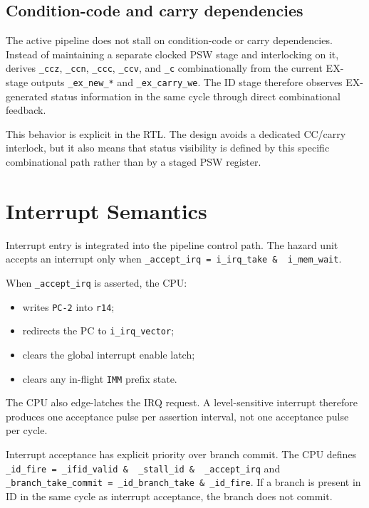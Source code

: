 \documentclass[11pt,a4paper]{article}
\begin{document}
\subsection{Condition-code and carry dependencies}

The active pipeline does not stall on condition-code or carry dependencies. Instead of maintaining a separate clocked PSW stage and interlocking on it,  derives \texttt{\_ccz}, \texttt{\_ccn}, \texttt{\_ccc}, \texttt{\_ccv}, and \texttt{\_c} combinationally from the current EX-stage outputs \texttt{\_ex\_new\_*} and \texttt{\_ex\_carry\_we}. The ID stage therefore observes EX-generated status information in the same cycle through direct combinational feedback.

This behavior is explicit in the RTL. The design avoids a dedicated CC/carry interlock, but it also means that status visibility is defined by this specific combinational path rather than by a staged PSW register.

\section{Interrupt Semantics}

Interrupt entry is integrated into the pipeline control path. The hazard unit accepts an interrupt only when \texttt{\_accept\_irq = i\_irq\_take \& \string~i\_mem\_wait}.

When \texttt{\_accept\_irq} is asserted, the CPU:
\begin{itemize}
    \item writes \texttt{PC-2} into \texttt{r14};
    \item redirects the PC to \texttt{i\_irq\_vector};
    \item clears the global interrupt enable latch;
    \item clears any in-flight \texttt{IMM} prefix state.
\end{itemize}

The CPU also edge-latches the IRQ request. A level-sensitive interrupt therefore produces one acceptance pulse per assertion interval, not one acceptance pulse per cycle.

Interrupt acceptance has explicit priority over branch commit. The CPU defines \texttt{\_id\_fire = \_ifid\_valid \& \string~\_stall\_id \& \string~\_accept\_irq} and \texttt{\_branch\_take\_commit = \_id\_branch\_take \& \_id\_fire}. If a branch is present in ID in the same cycle as interrupt acceptance, the branch does not commit.
\end{document}
